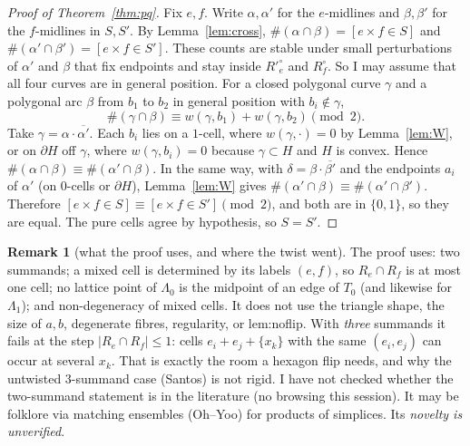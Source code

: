 \documentclass[11pt]{article}
\theoremstyle{definition}
\newtheorem{remark}[theorem]{Remark}
\begin{document}
\begin{proof}[Proof of Theorem~\ref{thm:pq}]
Fix $e,f$. Write $\alpha,\alpha'$ for the $e$-midlines and $\beta,\beta'$ for the $f$-midlines in $S,S'$. By Lemma~\ref{lem:cross}, $\#(\alpha\cap\beta)=[e\times f\in S]$ and
$\#(\alpha'\cap\beta')=[e\times f\in S']$. These counts are stable under small perturbations of $\alpha'$ and $\beta$ that fix endpoints and stay inside $R'^\circ_e$ and $R^\circ_f$. So I may assume that all
four curves are in general position. For a closed polygonal curve $\gamma$ and a polygonal arc $\beta$ from $b_1$ to $b_2$ in general position with $b_i\notin\gamma$,
\[\#(\gamma\cap\beta)\equiv w(\gamma,b_1)+w(\gamma,b_2)\pmod 2 .\]
Take $\gamma=\alpha\cdot\overline{\alpha'}$. Each $b_i$ lies on a $1$-cell, where $w(\gamma,\cdot)=0$ by Lemma~\ref{lem:W}, or on $\partial H$ off $\gamma$, where
$w(\gamma,b_i)=0$ because $\gamma\subset H$ and $H$ is convex. Hence $\#(\alpha\cap\beta)\equiv\#(\alpha'\cap\beta)$. In the same way, with
$\delta=\beta\cdot\overline{\beta'}$ and the endpoints $a_i$ of $\alpha'$ (on $0$-cells or $\partial H$), Lemma~\ref{lem:W} gives $\#(\alpha'\cap\beta)\equiv\#(\alpha'\cap\beta')$.
Therefore $[e\times f\in S]\equiv[e\times f\in S']\pmod2$, and both are in $\{0,1\}$, so they are equal. The pure cells agree by hypothesis, so $S=S'$.
\end{proof}

\begin{remark}[what the proof uses, and where the twist went]
The proof uses: two summands; a mixed cell is determined by its labels $(e,f)$, so $R_e\cap R_f$ is at most one cell; no lattice point of $\Lambda_0$ is the midpoint of an edge of $T_0$ (and likewise for $\Lambda_1$); and
non-degeneracy of mixed cells. It does not use the triangle shape, the size of $a,b$, degenerate fibres, regularity, or lem:noflip. With \emph{three} summands it
fails at the step $|R_e\cap R_f|\le1$: cells $e_i+e_j+\{x_k\}$ with the same $(e_i,e_j)$ can occur at several $x_k$. That is exactly the room a hexagon flip needs, and why the untwisted 3-summand case (Santos)
is not rigid. I have not checked whether the two-summand statement is in the literature (no browsing this session). It may be folklore via matching ensembles
(Oh--Yoo) for products of simplices. Its \emph{novelty is unverified}.
\end{remark}
\end{document}

